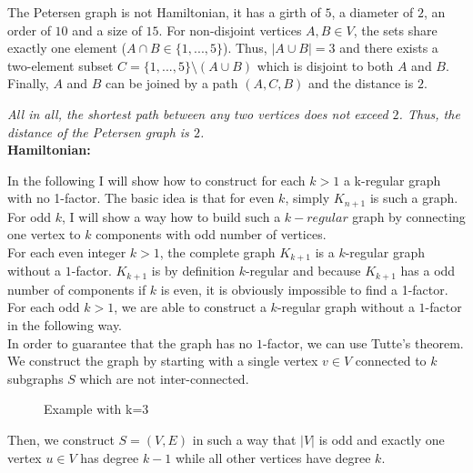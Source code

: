 \documentclass[a4paper]{article}
\begin{document}
\begin{solution}{9}
\begin{theorem}{The Petersen graph is not Hamiltonian, it has a girth of $5$, a diameter of $2$, an order of $10$ and a size of $15$.}
				For non-disjoint vertices $A, B \in V$, the sets share exactly one element ($A \cap B \in \{1, ..., 5\}$). Thus, $|A \cup B| = 3$ and there exists a two-element subset $C = \{1, ..., 5\} \setminus (A \cup B)$ which is disjoint to both $A$ and $B$. Finally, $A$ and $B$ can be joined by a path $(A, C, B)$ and the distance is $2$.

				\emph{All in all, the shortest path between any two vertices does not exceed $2$. Thus, the distance of the Petersen graph is $2$.}\\

			\textbf{Hamiltonian:}

		\end{theorem}
	\end{solution}
	\newpage
	\begin{solution}{11}
		In the following I will show how to construct for each $k>1$ a k-regular graph with no 1-factor. 
		The basic idea is that for even $k$, simply $K_{n+1}$ is such a graph. 
		For odd $k$,  I will show a way how to build such a $k-regular$ graph by connecting one vertex to $k$ components with odd number of vertices.  \\ 
		
		
		For each even integer $k > 1$, the complete graph $K_{k+1}$ is a $k$-regular graph without a $1$-factor. 
		$K_{k+1}$ is by definition $k$-regular and because $K_{k+1}$ has a odd number of components if $k$ is even, it is obviously impossible to find a 1-factor. 
		For each odd $k > 1$, we are able to construct a $k$-regular graph without a $1$-factor in the following way. \\
		
		In order to guarantee that the graph has no $1$-factor, we can use Tutte's theorem. We construct the graph by starting with a single vertex $v \in V$ connected to $k$ subgraphs $S$ which are not inter-connected. 
		\begin{figure}[h]
			\centering
		\caption{Example with k=3}
		\end{figure}
		Then, we construct $S=(V,E)$ in such a way that $|V|$ is odd and exactly one vertex $u \in V$ has degree $k-1$ while all other vertices have degree $k$.
 

\end{solution}
\end{document}
